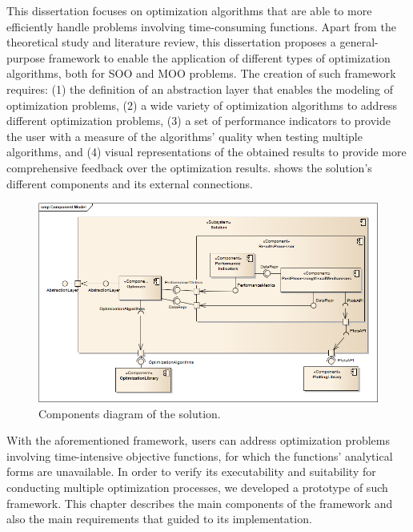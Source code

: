 \label{chap:architecture}

This dissertation focuses on optimization algorithms that are able to more efficiently handle problems involving time-consuming functions. Apart from the theoretical study and literature review, this dissertation proposes a general-purpose framework to enable the application of different types of optimization algorithms, both for \ac{SOO} and \ac{MOO} problems. The creation of such framework requires: (1) the definition of an abstraction layer that enables the modeling of optimization problems, (2) a wide variety of optimization algorithms to address different optimization problems, (3) a set of performance indicators to provide the user with a measure of the algorithms' quality when testing multiple algorithms, and (4) visual representations of the obtained results to provide more comprehensive feedback over the optimization results.  shows the  solution's different components and its external connections.

\begin{figure}[htbp]
	\centering
	\includegraphics[width=\textwidth]{./Images/Solution/ComponentModel3.png}
	\caption{Components diagram of the solution.}
	\label{fig:solution}
\end{figure}

With the aforementioned framework, users can address optimization problems involving time-intensive objective functions, for which the functions' analytical forms are unavailable. In order to verify its executability and suitability for conducting multiple optimization processes, we developed a prototype of such framework. This chapter describes the main components of the framework and also the main requirements that guided to its implementation. 

